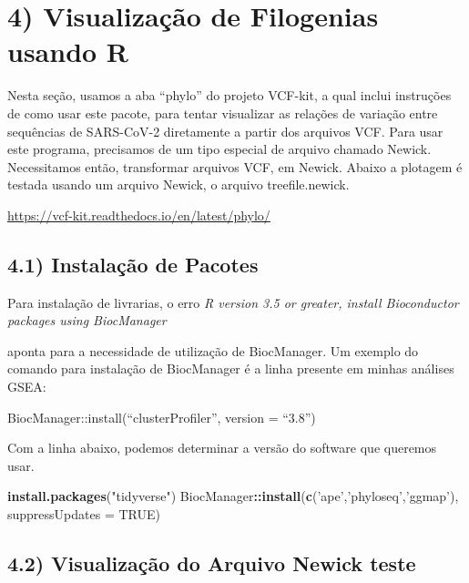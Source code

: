 \documentclass[
]{article}
\newenvironment{Shaded}{\begin{snugshade}}{\end{snugshade}}
\newcommand{\DataTypeTok}[1]{\textcolor[rgb]{0.13,0.29,0.53}{#1}}
\newcommand{\KeywordTok}[1]{\textcolor[rgb]{0.13,0.29,0.53}{\textbf{#1}}}
\newcommand{\NormalTok}[1]{#1}
\newcommand{\OperatorTok}[1]{\textcolor[rgb]{0.81,0.36,0.00}{\textbf{#1}}}
\newcommand{\OtherTok}[1]{\textcolor[rgb]{0.56,0.35,0.01}{#1}}
\newcommand{\StringTok}[1]{\textcolor[rgb]{0.31,0.60,0.02}{#1}}
\begin{document}
\hypertarget{visualizauxe7uxe3o-de-filogenias-usando-r}{%
\section{4) Visualização de Filogenias usando
R}\label{visualizauxe7uxe3o-de-filogenias-usando-r}}

Nesta seção, usamos a aba ``phylo'' do projeto VCF-kit, a qual inclui
instruções de como usar este pacote, para tentar visualizar as relações
de variação entre sequências de SARS-CoV-2 diretamente a partir dos
arquivos VCF. Para usar este programa, precisamos de um tipo especial de
arquivo chamado Newick. Necessitamos então, transformar arquivos VCF, em
Newick. Abaixo a plotagem é testada usando um arquivo Newick, o arquivo
treefile.newick.

\url{https://vcf-kit.readthedocs.io/en/latest/phylo/}

\hypertarget{instalauxe7uxe3o-de-pacotes}{%
\subsection{4.1) Instalação de
Pacotes}\label{instalauxe7uxe3o-de-pacotes}}

Para instalação de livrarias, o erro \emph{R version 3.5 or greater,
install Bioconductor packages using BiocManager}

aponta para a necessidade de utilização de BiocManager. Um exemplo do
comando para instalação de BiocManager é a linha presente em minhas
análises GSEA:

BiocManager::install(``clusterProfiler'', version = ``3.8'')

Com a linha abaixo, podemos determinar a versão do software que queremos
usar.

\begin{Shaded}
\begin{Highlighting}[]
\KeywordTok{install.packages}\NormalTok{(}\StringTok{"tidyverse"}\NormalTok{)}
\NormalTok{BiocManager}\OperatorTok{::}\KeywordTok{install}\NormalTok{(}\KeywordTok{c}\NormalTok{(}\StringTok{'ape'}\NormalTok{,}\StringTok{'phyloseq'}\NormalTok{,}\StringTok{'ggmap'}\NormalTok{), }\DataTypeTok{suppressUpdates =} \OtherTok{TRUE}\NormalTok{)}
\end{Highlighting}
\end{Shaded}

\hypertarget{visualizauxe7uxe3o-do-arquivo-newick-teste}{%
\subsection{4.2) Visualização do Arquivo Newick
teste}\label{visualizauxe7uxe3o-do-arquivo-newick-teste}}
\end{document}
